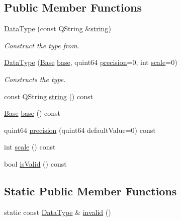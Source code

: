 \subsection*{Public Member Functions}
\begin{DoxyCompactItemize}
\item 
\hyperlink{class_data_type_aa777acb36257198ce8db6d396fb94bb6}{Data\+Type} (const Q\+String \&\hyperlink{class_data_type_a61123733098ff8d26bef2a6a6401db83}{string})
\begin{DoxyCompactList}\small\item\em Construct the type from. \end{DoxyCompactList}\item 
\hyperlink{class_data_type_afe0f057e4b0556dd17cbefa59b2487dc}{Data\+Type} (\hyperlink{class_data_type_a8df455d8d3949b604fbb2967dfeff239}{Base} \hyperlink{class_data_type_ab74107f47a2a754eaf4b72e7b20e00d3}{base}, quint64 \hyperlink{class_data_type_a14a632d64fb970501b78c7b6f18d3ca7}{precision}=0, int \hyperlink{class_data_type_ad7bd76d9d549701b91bd9ede3dce889a}{scale}=0)
\begin{DoxyCompactList}\small\item\em Constructs the type. \end{DoxyCompactList}\item 
const Q\+String \hyperlink{class_data_type_a61123733098ff8d26bef2a6a6401db83}{string} () const
\item 
\hyperlink{class_data_type_a8df455d8d3949b604fbb2967dfeff239}{Base} \hyperlink{class_data_type_ab74107f47a2a754eaf4b72e7b20e00d3}{base} () const
\item 
quint64 \hyperlink{class_data_type_a14a632d64fb970501b78c7b6f18d3ca7}{precision} (quint64 default\+Value=0) const
\item 
int \hyperlink{class_data_type_ad7bd76d9d549701b91bd9ede3dce889a}{scale} () const
\item 
bool \hyperlink{class_data_type_ad7629e3562fdd2ad8afea12050dec31b}{is\+Valid} () const
\end{DoxyCompactItemize}
\subsection*{Static Public Member Functions}
\begin{DoxyCompactItemize}
\item 
static const \hyperlink{class_data_type}{Data\+Type} \& \hyperlink{class_data_type_a57b17d24ef05c53131e20dfcd54e219d}{invalid} ()
\end{DoxyCompactItemize}


